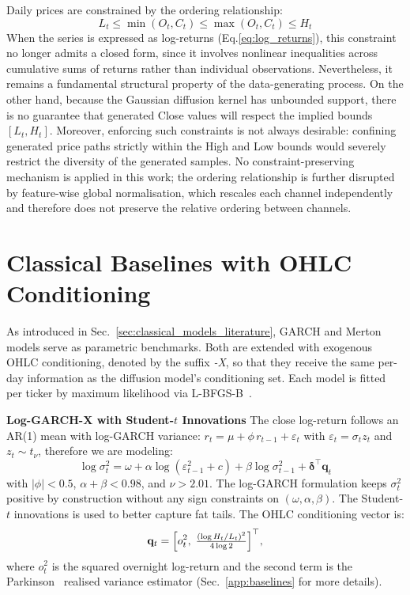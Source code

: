 Daily prices are constrained by the ordering relationship:
\[L_t \leq \min(O_t, C_t) \leq \max(O_t, C_t) \leq H_t\] 
When the series is expressed as log-returns (Eq.\ref{eq:log_returns}), this constraint no longer 
admits a closed form, since it involves nonlinear inequalities across cumulative sums of returns rather than individual observations. 
Nevertheless, it remains a fundamental structural property of the data-generating 
process. On the other hand, because the Gaussian diffusion kernel has unbounded 
support, there is no guarantee that generated Close values will respect the implied 
bounds $[L_t, H_t]$. Moreover, enforcing such constraints is not always desirable: 
confining generated price paths strictly within the High and Low bounds would 
severely restrict the diversity of the generated samples. No constraint-preserving 
mechanism is applied in this work; the ordering relationship is further disrupted by 
feature-wise global normalisation, which rescales each channel independently and 
therefore does not preserve the relative ordering between channels.

\section{Classical Baselines with OHLC Conditioning}
\label{sec:classical_baselines_theoretical}

As introduced in Sec.\ \ref{sec:classical_models_literature}, GARCH and Merton
models serve as parametric benchmarks. Both are extended with exogenous OHLC
conditioning, denoted by the suffix \emph{-X}, so that they receive the same
per-day information as the diffusion model's conditioning set. Each model is fitted per ticker by maximum likelihood
via L-BFGS-B\ \cite{byrd1995limited}.

\textbf{Log-GARCH-X with Student-$t$ Innovations} \quad The close log-return follows an AR(1) mean with log-GARCH variance: \(r_t = \mu + \phi\, r_{t-1} + \varepsilon_t\) with \(\varepsilon_t = \sigma_t z_t\) and \(z_t \sim t_\nu\), therefore we are modeling:
\begin{equation}
\label{eq:garch_x_var}
\log \sigma_t^2 = \omega + \alpha \log(\varepsilon_{t-1}^2 + c)
        + \beta \log \sigma_{t-1}^2 + \boldsymbol{\delta}^\top \mathbf{q}_t
\end{equation}
with $|\phi|<0.5$, $\alpha+\beta<0.98$, and $\nu>2.01$. The log-GARCH
formulation keeps $\sigma_t^2$ positive by construction without any sign
constraints on $(\omega,\alpha,\beta)$. The Student-$t$ innovations is used to better capture fat tails. The OHLC conditioning vector is:
\[
    \mathbf{q}_t = \Bigl[ o_t^2,\;
    \tfrac{(\log H_t/L_t)^2}{4 \log 2} \Bigr]^\top,
\]
where $o_t^2$ is the squared overnight log-return and the second term is
the Parkinson\ \cite{parkinson1980extreme} realised variance estimator
(Sec.\ \ref{app:baselines} for more details).

